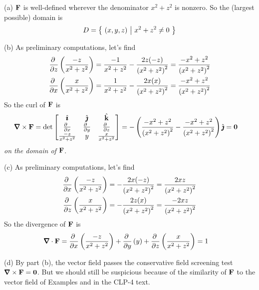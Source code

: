 \begin{solution}(a) $\mathbf{F}$ is well-defined wherever the denominator
$x^2+z^2$ is nonzero. So the (largest possible) domain is
\begin{align*}
D=\big\{ \ (x,y,z)\ \big|\ x^2+z^2\ne 0\ \big\}
\end{align*}

\noindent (b) 
As preliminary computations, let's find
\begin{align*}
\pdiff{}{z}\left(\frac{-z}{x^2+z^2}\right)
&=\frac{-1}{x^2+z^2}-\frac{2z(-z)}{{(x^2+z^2)}^2}
=\frac{-x^2+z^2}{{(x^2+z^2)}^2}
\\
\pdiff{}{x}\left(\frac{x}{x^2+z^2}\right)
&=\frac{1}{x^2+z^2}-\frac{2x(x)}{{(x^2+z^2)}^2}
=\frac{-x^2+z^2}{{(x^2+z^2)}^2}
\end{align*}
So the curl of $\mathbf{F}$ is
\begin{align*}
\vnabla\times\vF
&=\det\left[\begin{matrix}
\hi &\hj &\hk \\
\tfrac{\partial\hfill}{\partial x} & \tfrac{\partial\hfill}{\partial y} & 
                \tfrac{\partial\hfill}{\partial z} \\
\frac{-z}{x^2+z^2} & y & \frac{x}{x^2+z^2}
\end{matrix}
\right]
=-\left(\frac{-x^2+z^2}{{(x^2+z^2)}^2}
  -\frac{-x^2+z^2}{{(x^2+z^2)}^2}\right)\hj
=\vZero
\end{align*}
\emph{on the domain of $\mathbf{F}$}.

\noindent (c)
As preliminary computations, let's find
\begin{align*}
\pdiff{}{x}\left(\frac{-z}{x^2+z^2}\right)
&=-\frac{2x(-z)}{{(x^2+z^2)}^2}
=\frac{2xz}{{(x^2+z^2)}^2}
\\
\pdiff{}{z}\left(\frac{x}{x^2+z^2}\right)
&=-\frac{2z(x)}{{(x^2+z^2)}^2}
=\frac{-2xz}{{(x^2+z^2)}^2}
\end{align*}
So the divergence of $\mathbf{F}$ is
\begin{align*}
\vnabla\cdot\vF
&=\pdiff{}{x}\left(\frac{-z}{x^2+z^2}\right)
  +\pdiff{}{y}\left(y\right)
  + \pdiff{}{z}\left(\frac{x}{x^2+z^2}\right)
=1
\end{align*}

\noindent (d) 
By part (b), the vector field passes the conservative field screening test
$\vnabla\times\vF=\vZero$. But we should still be suspicious because
of the similarity of $\mathbf{F}$ to the vector field of 
Examples  and 
in the CLP-4 text.


\end{solution}
